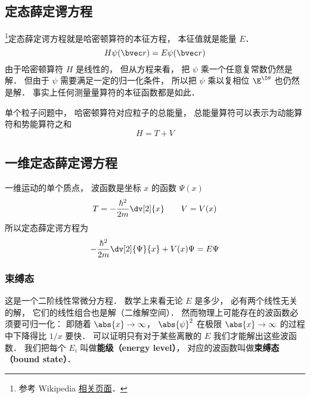 
\begin{issues}
\issueTODO
\issueAbstract
\end{issues}


\subsection{定态薛定谔方程}
\footnote{参考 Wikipedia \href{https://en.wikipedia.org/wiki/Finite_potential_well}{相关页面}．}定态薛定谔方程就是哈密顿算符的本征方程， 本征值就是能量 $E$．
\begin{equation}
H \psi(\bvec r) = E \psi(\bvec r)
\end{equation}
由于哈密顿算符 $H$ 是线性的， 但从方程来看， 把 $\psi$ 乘一个任意复常数仍然是解． 但由于 $\psi$ 需要满足一定的归一化条件， 所以把 $\psi$ 乘以复相位 $\E^{\I\theta}$ 也仍然是解． 事实上任何测量量算符的本征函数都是如此．

单个粒子问题中， 哈密顿算符对应粒子的总能量， 总能量算符可以表示为动能算符和势能算符之和
\begin{equation}
H = T + V
\end{equation}

\subsection{一维定态薛定谔方程}

一维运动的单个质点， 波函数是坐标 $x$ 的函数 $\Psi(x)$
\begin{equation}
T = -\frac{\hbar^2}{2m} \dv[2]{x} \qquad V = V(x)
\end{equation}
所以定态薛定谔方程为
\begin{equation}\label{SchEq_eq1}
-\frac{\hbar^2}{2m} \dv[2]{\Psi}{x} + V(x)\Psi = E \Psi
\end{equation}

\subsubsection{束缚态}
这是一个二阶线性常微分方程． 数学上来看无论 $E$ 是多少， 必有两个线性无关的解， 它们的线性组合也是解（二维解空间）． 然而物理上可能存在的波函数必须要可归一化： 即随着 $\abs{x} \to \infty$，  $\abs{\psi}^2$ 在极限 $\abs{x}\to\infty$ 的过程中下降得比 $1/x$ 要快． 可以证明只有对于某些离散的 $E$ 我们才能解出这些波函数． 我们把每个 $E_i$ 叫做\textbf{能级（energy level）}， 对应的波函数叫做\textbf{束缚态（bound state）}．

